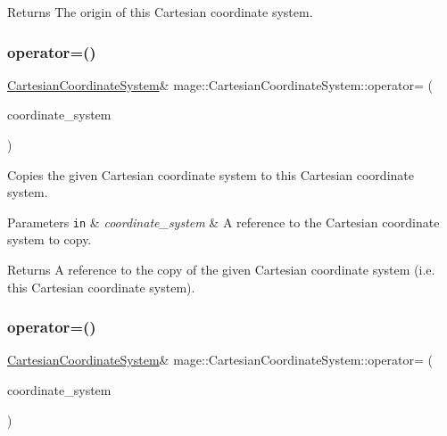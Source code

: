 \begin{DoxyReturn}{Returns}
The origin of this Cartesian coordinate system. 
\end{DoxyReturn}
\hypertarget{structmage_1_1_cartesian_coordinate_system_acf9dab4edc5c07b5bbf6bee0bdfe317c}{}\label{structmage_1_1_cartesian_coordinate_system_acf9dab4edc5c07b5bbf6bee0bdfe317c} 
\subsubsection{\texorpdfstring{operator=()}{operator=()}\hspace{0.1cm}{\footnotesize\ttfamily [1/2]}}
{\footnotesize\ttfamily \hyperlink{structmage_1_1_cartesian_coordinate_system}{Cartesian\+Coordinate\+System}\& mage\+::\+Cartesian\+Coordinate\+System\+::operator= (\begin{DoxyParamCaption}\item[{const \hyperlink{structmage_1_1_cartesian_coordinate_system}{Cartesian\+Coordinate\+System} \&}]{coordinate\+\_\+system }\end{DoxyParamCaption})\hspace{0.3cm}{\ttfamily [default]}}

Copies the given Cartesian coordinate system to this Cartesian coordinate system.


\begin{DoxyParams}[1]{Parameters}
\mbox{\tt in}  & {\em coordinate\+\_\+system} & A reference to the Cartesian coordinate system to copy. \\
\hline
\end{DoxyParams}
\begin{DoxyReturn}{Returns}
A reference to the copy of the given Cartesian coordinate system (i.\+e. this Cartesian coordinate system). 
\end{DoxyReturn}
\hypertarget{structmage_1_1_cartesian_coordinate_system_afc51347ff3f42576c483c76f5747c4c6}{}\label{structmage_1_1_cartesian_coordinate_system_afc51347ff3f42576c483c76f5747c4c6} 
\subsubsection{\texorpdfstring{operator=()}{operator=()}\hspace{0.1cm}{\footnotesize\ttfamily [2/2]}}
{\footnotesize\ttfamily \hyperlink{structmage_1_1_cartesian_coordinate_system}{Cartesian\+Coordinate\+System}\& mage\+::\+Cartesian\+Coordinate\+System\+::operator= (\begin{DoxyParamCaption}\item[{\hyperlink{structmage_1_1_cartesian_coordinate_system}{Cartesian\+Coordinate\+System} \&\&}]{coordinate\+\_\+system }\end{DoxyParamCaption})\hspace{0.3cm}{\ttfamily [default]}}

